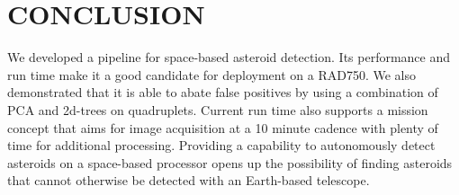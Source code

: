 \documentclass{article}
\begin{document}
\vspace{-0.3cm}
\section{CONCLUSION}
We developed a pipeline for space-based asteroid detection. Its performance and run time make it a good candidate for deployment on a RAD750. We also demonstrated that it is able to abate false positives by using a combination of PCA and 2d-trees on quadruplets. Current run time also supports a mission concept that aims for image acquisition at a 10 minute cadence with plenty of time for additional processing. Providing a capability to autonomously detect asteroids on a space-based processor opens up the possibility of finding asteroids that cannot otherwise be detected with an Earth-based telescope.


%
\end{document}
